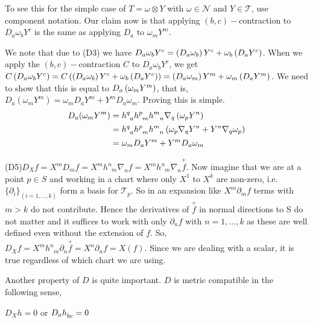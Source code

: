 To see this for the simple case of $T = \omega \otimes Y$ with $\omega \in \mathscr{N}$ and $Y \in \mathscr{T}$, use component notation. Our claim now is that applying $(b,c)-$contraction to $D_a \omega_b Y^c$ is the same as applying $D_a$ to $\omega_m Y^m$. 

We note that due to (D3) we have $  D_a \omega_b Y^c = \left( D_a \omega_b \right) Y^c + \omega_b \left( D_a Y^c \right)$. When we apply the $(b,c)-$contraction $C$ to $ D_a \omega_b Y^c $, we get $C \left( D_a \omega_b Y^c \right)= C\left( \left( D_a \omega_b \right) Y^c + \omega_b \left( D_a Y^c \right) \right) = \left( D_a \omega_m \right) Y^m + \omega_m \left( D_a Y^m \right)$. We need to show that this is equal to $D_a \left( \omega_m Y^m \right)$, that is, $D_a (\omega_m Y^m )= \omega_m D_a Y^m + Y^m D_a \omega_m$. Proving this is simple.
\begin{align*}
	D_a (\omega_m Y^m) &= \tt{h}{q}{a} \tt{h}{p}{m} \tt{h}{m}{n} \nabla_q \lera{\omega_p Y^n} \\
	&= \tt{h}{q}{a} \tt{h}{p}{m} \tt{h}{m}{n} \lera{\omega_p \nabla_q Y^n + Y^n \nabla_q \omega_p} \\
	&= \omega_m D_a Y^m + Y^m D_a \omega_m
\end{align*}


(D5)$D_X f = X^m D_m f = X^m h^n_{\phantom{n}m} \nabla_n f = X^m h^n_{\phantom{n}m} \nabla_n \overset{+}{f}$. Now imagine that we are at a point $ p \in S$ and working in a chart where only $X^1$ to $X^k$ are non-zero, i.e. $\{\partial_i\}_{(i=1,\ldots,k)}$ form a basis for $ \mathscr{T}_p$. So in an expansion like $X^m \partial_m f$ terms with $m > k$ do not contribute. Hence the derivatives of $\overset{+}{f}$ in normal directions to S do not matter and it suffices to work with only $\partial_n f$ with $n = 1, \ldots, k$ as these are well defined even without the extension of $ f$. So, $D_X f = X^m h^n_{\phantom{n}m} \partial_n \overset{+}{f} = X^n \partial_n f = X(f)$. Since we are dealing with a scalar, it is true regardless of which chart we are using. 


Another property of $ D $ is quite important. $ D$ is metric compatible in the following sense,  

\begin{proposition}
    $D_X h =0$ or $D_a \tt{h}{}{bc} = 0$
\end{proposition}

